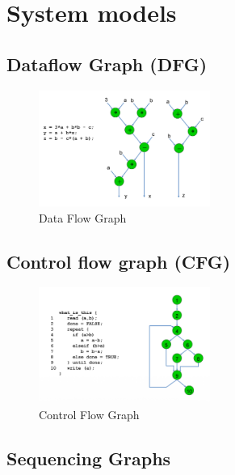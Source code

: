 \section{System models}
\subsection{Dataflow Graph (DFG)}
\begin{figure}[h]
	\begin{center}
		\includegraphics[width=0.5\textwidth]{images/DFG.png}
		\caption{Data Flow Graph}
		\label{fig:DFG}
	\end{center}
\end{figure}

\subsection{Control flow graph (CFG)}
\begin{figure}[h]
	\begin{center}
		\includegraphics[width=0.5\textwidth]{images/CFG.png}
		\caption{Control Flow Graph}
		\label{fig:CFG}
	\end{center}
\end{figure}

\subsection{Sequencing Graphs}

